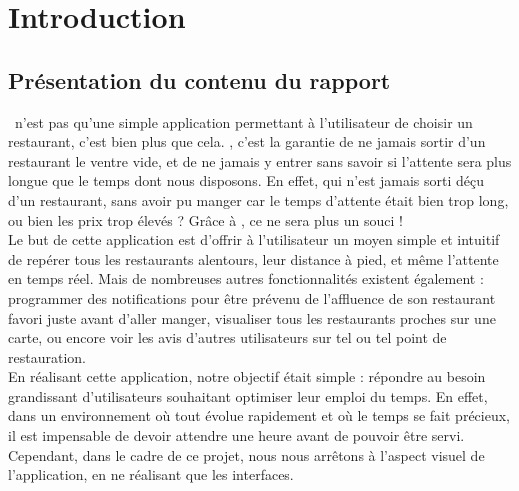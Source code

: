 





\newpage
\tableofcontents
{%
\let\oldnumberline\numberline%
\renewcommand{\numberline}{\figurename~\oldnumberline}%
\renewcommand\listfigurename{Liste des figures}
\listoffigures%
}
{%
\let\oldnumberline\numberline%
\renewcommand{\numberline}{\tablename~\oldnumberline}%
\renewcommand\listtablename{Liste des tableaux}
\listoftables%
}

\newpage
{}
\chapter*{Introduction}
\section*{Présentation du contenu du rapport}

\appname~n'est pas qu'une simple application permettant à l'utilisateur de choisir un restaurant, c'est bien plus que cela. \appname, c'est la garantie de ne jamais sortir d'un restaurant le ventre vide, et de ne jamais y entrer sans savoir si l'attente sera plus longue que le temps dont nous disposons. En effet, qui n'est jamais sorti déçu d'un restaurant, sans avoir pu manger car le temps d'attente était bien trop long, ou bien les prix trop élevés ? Grâce à \appname, ce ne sera plus un souci !\\
Le but de cette application est d'offrir à l'utilisateur un moyen simple et intuitif de repérer tous les restaurants alentours, leur distance à pied, et même l'attente en temps réel. Mais de nombreuses autres fonctionnalités existent également : programmer des notifications pour être prévenu de l'affluence de son restaurant favori juste avant d'aller manger, visualiser tous les restaurants proches sur une carte, ou encore voir les avis d'autres utilisateurs sur tel ou tel point de restauration.\\
En réalisant cette application, notre objectif était simple : répondre au besoin grandissant d'utilisateurs souhaitant optimiser leur emploi du temps. En effet, dans un environnement où tout évolue rapidement et où le temps se fait précieux, il est impensable de devoir attendre une heure avant de pouvoir être servi. Cependant, dans le cadre de ce projet, nous nous arrêtons à l'aspect visuel de l'application, en ne réalisant que les interfaces.

